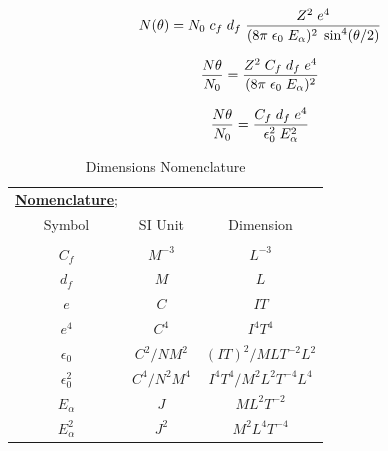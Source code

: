 \documentclass[12pt]{article}
\begin{document}
\begin{multicols}{2}
\centering

\begin{equation}
N(\theta) = N_0 \hspace{0.1cm} c_f \hspace{0.1cm} d_f \hspace{0.1cm} \dfrac{Z^2 \hspace{0.1cm} e^4}{(8 \pi \hspace{0.1cm} \epsilon_0 \hspace{0.1cm} E_{\alpha})^2 \hspace{0.1cm} \sin^4(\theta / 2) }
\end{equation} 

\begin{equation}
\dfrac{N\theta}{N_0} = \dfrac{Z^2 \hspace{0.1cm} C_f \hspace{0.1cm} d_f \hspace{0.1cm} e^4}{(8\pi \hspace{0.1cm} \epsilon_0 \hspace{0.1cm} E_{\alpha})^2}
\end{equation} 

\begin{equation}
\dfrac{N\theta}{N_0} = \dfrac{C_f \hspace{0.1cm} d_f \hspace{0.1cm} e^4}{\epsilon_0^2 \hspace{0.1cm} E_{\alpha}^2}
\label{simple}
\end{equation} 

\begin{table}[H]
\begin{center}
 \footnotesize
 \begin{tabular}{c c c}
 \textbf{\underline{Nomenclature}}; \\ [0.3cm]
 Symbol & SI Unit & Dimension \\
 \hline \\ [-0.3cm]
 $C_f$ & $M^{-3}$ & $L^{-3}$ \\[0.05cm]
 $d_f$ & $M$ & $L$ \\[0.05cm]
 $e$ & $C$ & $IT$ \\[0.05cm]
 $e^4$ & $C^4$ & $I^4T^4$ \\[0.03cm]
 $\epsilon_0$ & $C^2 / NM^2$ & $(IT)^2 / MLT^{-2}L^2$ \\[0.09cm]
 $\epsilon_0^2$ & $C^4 / N^2M^4$ & $I^4T^4 / M^2L^2T^{-4}L^4$ \\[0.09cm]
 $E_{\alpha}$ & $J$ & $ML^2T^{-2}$ \\[0.09cm]
 $E_{\alpha}^2$ & $J^2$ & $M^2L^4T^{-4}$ \\
 \end{tabular}
 \caption{Dimensions Nomenclature}
 \label{Dimensions Nomenclature}
\end{center}
\end{table}
\end{multicols}
\end{document}

